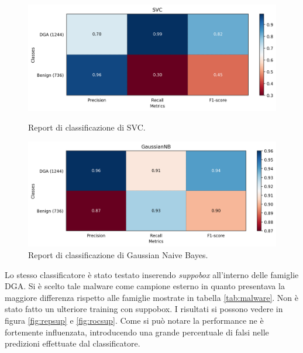 \begin{figure}[!htbp]
  	\centering
    \includegraphics[width=.85\columnwidth]{figures/report_SVC.png}
    \caption{Report di classificazione di SVC.\label{fig:repsvc}}

	\centering
    \includegraphics[width=.85\columnwidth]{figures/report_GaussianNB.png}
    \caption{Report di classificazione di Gaussian Naive Bayes.\label{fig:repgnb}}
\end{figure}

Lo stesso classificatore è stato testato inserendo \textit{suppobox} all'interno delle famiglie DGA. Si è scelto tale malware come campione esterno in quanto presentava la maggiore differenza rispetto alle famiglie mostrate in tabella \ref{tab:malware}. Non è stato fatto un ulteriore training con suppobox. I risultati si possono vedere in figura \ref{fig:repsup} e \ref{fig:rocsup}. Come si può notare la performance ne è fortemente influenzata, introducendo una grande percentuale di falsi nelle predizioni effettuate dal classificatore.

